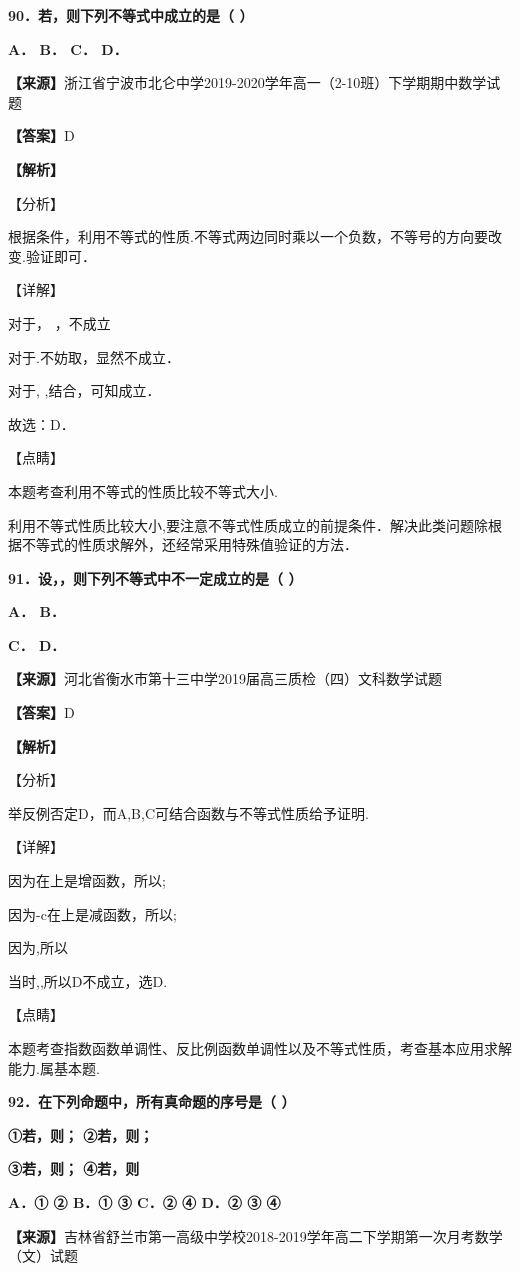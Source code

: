 \documentclass[
]{article}
\begin{document}
\textbf{90．若，则下列不等式中成立的是（ ）}

\textbf{A． B． C． D．}

\textbf{【来源】}浙江省宁波市北仑中学2019-2020学年高一（2-10班）下学期期中数学试题

\textbf{【答案】}D

\textbf{【解析】}

【分析】

根据条件，利用不等式的性质.不等式两边同时乘以一个负数，不等号的方向要改变.验证即可．

【详解】

对于， ，不成立

对于.不妨取，显然不成立．

对于, ,结合，可知成立．

故选：D．

【点睛】

本题考查利用不等式的性质比较不等式大小.

利用不等式性质比较大小,要注意不等式性质成立的前提条件．解决此类问题除根据不等式的性质求解外，还经常采用特殊值验证的方法．

\textbf{91．设，，则下列不等式中不一定成立的是（ ）}

\textbf{A． B．}

\textbf{C． D．}

\textbf{【来源】}河北省衡水市第十三中学2019届高三质检（四）文科数学试题

\textbf{【答案】}D

\textbf{【解析】}

【分析】

举反例否定D，而A,B,C可结合函数与不等式性质给予证明.

【详解】

因为在上是增函数，所以;

因为-c在上是减函数，所以;

因为,所以

当时,,所以D不成立，选D.

【点睛】

本题考查指数函数单调性、反比例函数单调性以及不等式性质，考查基本应用求解能力.属基本题.

\textbf{92．在下列命题中，所有真命题的序号是（ ）}

\textbf{①若，则； ②若，则；}

\textbf{③若，则； ④若，则}

\textbf{A．① ② B．① ③ C．② ④ D．② ③ ④}

\textbf{【来源】}吉林省舒兰市第一高级中学校2018-2019学年高二下学期第一次月考数学（文）试题
\end{document}
